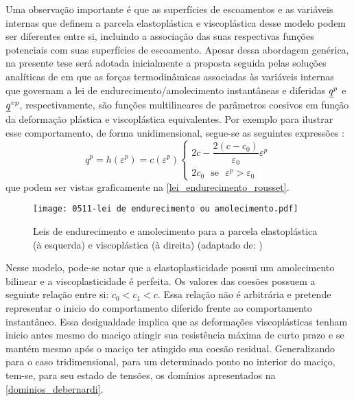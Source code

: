 Uma observação importante é que as superfícies de escoamentos e as variáveis internas que definem a parcela elastoplástica e viscoplástica desse modelo podem ser diferentes entre si, incluindo a associação das suas respectivas funções potenciais com suas superfícies de escoamento. Apesar dessa abordagem genérica, na presente tese será adotada inicialmente a proposta seguida pelas soluções analíticas de  em que as forças termodinâmicas associadas às variáveis internas que governam a lei de endurecimento/amolecimento instantâneas e diferidas $\underline q^p$ e $\underline q^{vp}$, respectivamente, são funções multilineares de parâmetros coesivos em função da deformação plástica e viscoplástica equivalentes. Por exemplo para ilustrar esse comportamento, de forma unidimensional, segue-se as seguintes expressões \cite[p. 220]{Rousset1988}:
\begin{equation}
	\label{eq:qp_rousset}
	q^p	= h(\varepsilon^p) = c(\varepsilon^p) \left\{
		\begin{array}{lcl}
			2c - \dfrac{2(c-c_0)}{\varepsilon_0}\varepsilon^p \\ 
			2c_0~~~\text{se}~~~\varepsilon^p > \varepsilon_0
		\end{array}
	\right.
\end{equation}
que podem ser vistas graficamente na \autoref{lei_endurecimento_rousset}.
\begin{figure}[H]
	\begin{center}
		\texttt{[image: 0511-lei de endurecimento ou amolecimento.pdf]}
	\end{center}
	\caption{\label{lei_endurecimento_rousset}Leis de endurecimento e amolecimento para a parcela elastoplástica (à esquerda) e viscoplástica (à direita) (adaptado de: )}
\end{figure}
Nesse modelo, pode-se notar que a elastoplasticidade possui um amolecimento bilinear e a viscoplasticidade é perfeita. Os valores das coesões possuem a seguinte relação entre si: $c_0 < c_1 < c$. Essa relação não é arbitrária e pretende representar o inicio do comportamento diferido frente ao comportamento instantâneo. Essa desigualdade implica que as deformações viscoplásticas tenham inicio antes mesmo do maciço atingir sua resistência máxima de curto prazo e se mantém mesmo após o maciço ter atingido sua coesão residual. Generalizando para o caso tridimensional, para um determinado ponto no interior do maciço, tem-se, para seu estado de tensões, os domínios apresentados na \autoref{dominios_debernardi}.
